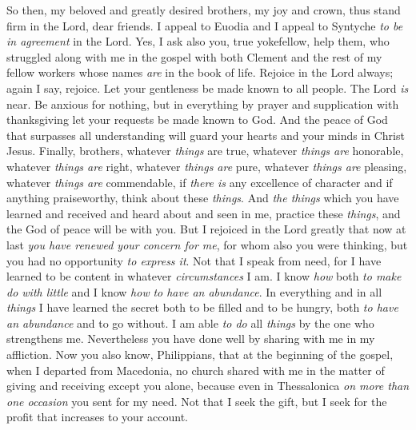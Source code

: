 \begin{biblechapter} %
 So then, my beloved and greatly desired brothers, my joy and crown, thus stand firm in the Lord, dear friends.
\verse I appeal to Euodia and I appeal to Syntyche \textit{to be in agreement} in the Lord.
\verse Yes, I ask also you, true yokefellow, help them, who struggled along with me in the gospel with both Clement and the rest of my fellow workers whose names \textit{are} in the book of life.
 Rejoice in the Lord always; again I say, rejoice.
\verse Let your gentleness be made known to all people. The Lord \textit{is} near.
\verse Be anxious for nothing, but in everything by prayer and supplication with thanksgiving let your requests be made known to God.
\verse And the peace of God that surpasses all understanding will guard your hearts and your minds in Christ Jesus.
\verse Finally, brothers, whatever \textit{things} are true, whatever \textit{things are} honorable, whatever \textit{things are} right, whatever \textit{things are} pure, whatever \textit{things are} pleasing, whatever \textit{things are} commendable, if \textit{there is} any excellence of character and if anything praiseworthy, think about these \textit{things}.
\verse And \textit{the things} which you have learned and received and heard about and seen in me, practice these \textit{things}, and the God of peace will be with you.
 But I rejoiced in the Lord greatly that now at last \textit{you have renewed your concern for me}, for whom also you were thinking, but you had no opportunity \textit{to express it}.
\verse Not that I speak from need, for I have learned to be content in whatever \textit{circumstances} I am.
\verse I know \textit{how} both \textit{to make do with little} and I know \textit{how} \textit{to have an abundance}. In everything and in all \textit{things} I have learned the secret both to be filled and to be hungry, both \textit{to have an abundance} and to go without.
\verse I am able \textit{to do} all \textit{things} by the one who strengthens me.
\verse Nevertheless you have done well by sharing with me in my affliction.
\verse Now you also know, Philippians, that at the beginning of the gospel, when I departed from Macedonia, no church shared with me in the matter of giving and receiving except you alone,
\verse because even in Thessalonica \textit{on more than one occasion} you sent for my need.
\verse Not that I seek the gift, but I seek for the profit that increases to your account.

\end{biblechapter}
